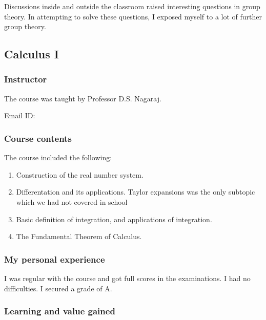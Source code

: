 \documentclass[a4paper]{amsart}
\begin{document}
Discussions inside and outside the classroom raised interesting questions
in group theory. In attempting to solve these questions, I exposed myself
to a lot of further group theory.

\subsection{Calculus I}\label{calculus1}

\subsubsection{Instructor}

The course was taught by Professor D.S. Nagaraj.

Email ID: 

\subsubsection{Course contents}

The course included the following:

\begin{enumerate}

\item Construction of the real number system.

\item Differentation and its applications. Taylor expansions was the only subtopic 
  which we had not covered in school

\item Basic definition of integration, and applications of integration.

\item The Fundamental Theorem of Calculus.

\end{enumerate}

\subsubsection{My personal experience}

I was regular with the course and got full scores in the examinations. I had no difficulties. I secured a grade of A.

\subsubsection{Learning and value gained}
\end{document}

